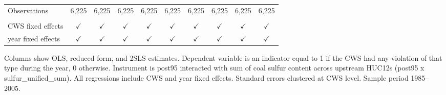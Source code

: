 \begin{table}[htbp]
\begin{adjustbox}{width = \textwidth, center}
\begin{tabular}{lccccccccc}
          \\
         
         Observations                                             & 6,225          & 6,225           & 6,225          & 6,225         & 6,225          & 6,225         & 6,225          & 6,225         & 6,225\\  
         
          \\
         
         CWS fixed effects                                        & $\checkmark$   & $\checkmark$    & $\checkmark$   & $\checkmark$  & $\checkmark$   & $\checkmark$  & $\checkmark$   & $\checkmark$  & $\checkmark$\\   
         year fixed effects                                       & $\checkmark$   & $\checkmark$    & $\checkmark$   & $\checkmark$  & $\checkmark$   & $\checkmark$  & $\checkmark$   & $\checkmark$  & $\checkmark$\\   
         
         \bottomrule
         
      \end{tabular}
      
      
      
   \end{adjustbox}
      {\tiny\linespread{1}\selectfont \par \raggedright 
   Columns show OLS, reduced form, and 2SLS estimates. Dependent variable is an indicator equal to 1 if the CWS had any violation of that type during the year, 0 otherwise. Instrument is post95 interacted with sum of coal sulfur content across upstream HUC12s (post95 x sulfur\_unified\_sum). All regressions include CWS and year fixed effects. Standard errors clustered at CWS level. Sample period 1985--2005.}
   
\end{table}


